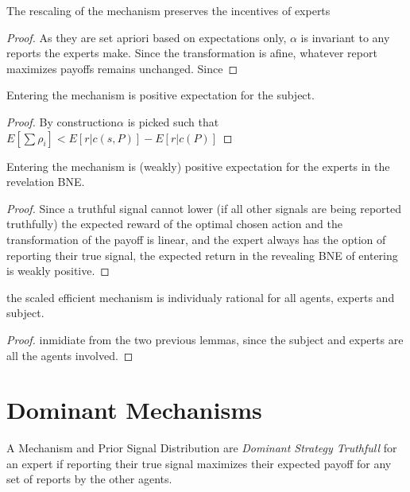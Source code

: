 \begin{lem}
	The rescaling of the mechanism preserves the incentives of experts
\end{lem}

\begin{proof}
	As they are set apriori based on expectations only, $\alpha$ is invariant to any reports the experts make. Since the transformation is afine, whatever report maximizes payoffs remains unchanged. Since 
\end{proof}


\begin{lem}
	Entering the mechanism is positive expectation for the subject.
\end{lem}

\begin{proof}
  By construction$ \alpha $ is picked such that $E[\sum \rho_i] < E[r|c(s,P)] - E[r|c(P)]$
\end{proof}


\begin{lem}
	Entering the mechanism is (weakly) positive expectation for the experts in the revelation BNE.
\end{lem}

\begin{proof}
Since a truthful signal cannot lower (if all other signals are being reported truthfully) the expected reward of the optimal chosen action and the transformation of the payoff is linear, and the expert always has the option of reporting their true signal, the expected return in the revealing BNE of entering is weakly positive.
\end{proof}


\begin{thm}
	the scaled efficient mechanism is individualy rational for all agents, experts and subject.
\end{thm}

\begin{proof}
inmidiate from the two previous lemmas, since the subject and experts are all the agents involved.
\end{proof}




\section{Dominant Mechanisms}

\begin{defn}
	A Mechanism and Prior Signal Distribution are \emph{Dominant Strategy Truthfull} for an expert if reporting their true signal maximizes their expected payoff for any set of reports by the other agents. 
\end{defn}

